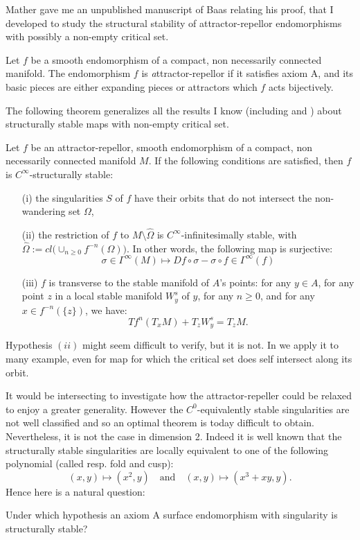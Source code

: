 \documentclass[11pt,openany,leqno]{article}
\begin{document}
Mather gave me an unpublished manuscript of Baas relating his proof, that I developed to study the structural stability of attractor-repellor endomorphisms with possibly a non-empty critical set. 

\begin{defi}  Let $f$ be a smooth endomorphism of a compact, non necessarily connected manifold.  The endomorphism $f$ is {\emph attractor-repellor} if it satisfies  axiom A, and its basic pieces are either expanding pieces or attractors which $f$ acts bijectively. 
\end{defi}

The following theorem generalizes all the results I know (including 
\cite{IPR08} and \cite{IPR10})  about structurally stable maps with non-empty critical set.

   
\begin{thm} Let $f$ be an {attractor-repellor}, smooth endomorphism of a compact, non necessarily connected manifold $M$. If the following conditions are satisfied, then $f$ is $C^\infty$-structurally stable:\begin{itemize}
\item[(i)] the singularities $S$ of $f$ have their orbits that do not intersect the non-wandering set $\Omega$,
\item[(ii)] the restriction of $f$ to $M\setminus \hat \Omega$ is $C^\infty$-infinitesimally stable, with $\hat \Omega:= cl\big(\cup_{n\ge 0} f^{-n}(\Omega)\big)$. In other words, the following map is surjective:
\[\sigma \in \Gamma^\infty(M) \mapsto Df\circ \sigma -\sigma \circ f\in 
 \Gamma^\infty(f)\]
 \item[(iii)] $f$ is transverse to the stable manifold of $A$'s points: for any $y\in A$, for any point $z$ in a local stable manifold $W^s_y$ of $y$, for any $n\ge 0$, and for any $x\in f^{-n}(\{z\})$, we have: 
\[Tf^n(T_xM)+T_zW_y^s=T_zM.\]
\end{itemize} 
\end{thm}
Hypothesis $(ii)$ might seem difficult to verify, but it is not. In \cite{Be12} we apply it to many example, even for map for which the critical set does self intersect along its orbit.

It would be intersecting to investigate how the attractor-repeller could be relaxed to enjoy a greater generality. However the $C^0$-equivalently stable singularities are not well classified and so an optimal theorem is today difficult to obtain. Nevertheless, it is not the case in dimension 2. Indeed it is well known that the structurally stable singularities are locally equivalent to one of the following polynomial (called resp. fold and cusp):
\[(x,y)\mapsto (x^2, y)\quad\text{and} \quad(x,y)\mapsto (x^3+xy, y).\]
Hence here is a natural question:
\begin{prob}
Under which hypothesis an axiom A surface endomorphism with singularity is structurally stable?
\end{prob}
\end{document}
